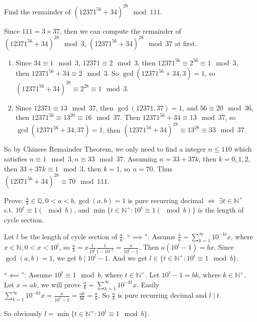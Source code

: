 \documentclass{ctexart}
\begin{document}
\begin{problem}\label{pro:45.2}
  Find the remainder of \((12371^{56} + 34)^{28} \mod 111 \).
\end{problem}
\begin{solution}
  Since \(111 = 3 \times 37\), then we can compute the remainder of \((12371^{56} + 34)^{28} \mod 3\), \((12371^{56} + 34)^{28} \mod 37\) at first.
  \begin{enumerate}
    \item Since \(34 \equiv 1\mod 3\), \(12371 \equiv 2 \mod 3\), then \(12371^{56} \equiv 2^{56}\equiv 1 \mod 3\), then
      \(12371^{56} + 34 \equiv 2 \mod 3\). So \(\gcd(12371^{56}+ 34,3)=1\), so \((12371^{56} + 34)^{28} \equiv 2^{28} \equiv 1 \mod 3\).
    \item Since \(12371 \equiv 13 \mod 37\), then \(\gcd(12371,37)=1\), and \(56 \equiv 20 \mod 36\), then
      \(12371^{56} \equiv 13^{20} \equiv 16 \mod 37\). Then \(12371^{56} + 34 \equiv 13 \mod 37\), so
      \(\gcd(12371^{56} + 34,37)=1\), then \((12371^{56} + 34)^{28} \equiv 13^{28} \equiv 33 \mod 37\).
  \end{enumerate}
  So by Chinese Remainder Theorem, we only need to find a integer \(n \leq 110\) which satisfies \(n \equiv 1 \mod 3, n \equiv 33 \mod 37\).
  Assuming \(n=33 + 37k\), then \(k =0,1,2\), then \(33 + 37k \equiv 1 \mod 3\), then \(k=1\), so \(n=70\).
  Thus \((12371^{56}+34)^{28} \equiv 70 \mod 111\).

\end{solution}

\begin{problem}\label{pro:45.4}
  Prove: \(\frac{a}{b} \in \mathbb{Q}, 0 < a<b , \gcd(a,b)=1\) is pure recurring decimal \(\iff\)
  \(\exists t \in \mathbb{N}^+\) s.t. \(10^t \equiv 1(\mod b)\), and \(\min\{t \in \mathbb{N}^+: 10^t \equiv 1(\mod b)\}\) is the length of cycle section.
\end{problem}
\begin{solution}

  Let \(l\) be the length of cycle section of \(\frac{a}{b}\).
  ``\(\implies\)'': Assume \(\frac{a}{b}=\sum_{k=1}^{\infty} 10^{-kl} x\), where \(x \in \mathbb{N},0 < x <10^l\),
  so \(\frac{a}{b}=x\frac{1}{10^l} \frac{1}{1-10^{-l}}=\frac{x}{10^l-1}\).
  Then \(a(10^l-1)=bx\). Since \(\gcd(a,b)=1\), we get \(b \mid 10^l-1\).
  And we get \(l \in \{t \in \mathbb{N}^+:10^t \equiv 1 \mod b\}\).

  ``\(\impliedby\)'': Assume \(10^t \equiv 1 \mod b\), where \(t \in \mathbb{N}^+\).
  Let \(10^t-1=bk\), where \(k \in \mathbb{N}^+\). Let \(x=ak\), we will prove \(\frac{a}{b}=\sum_{k=1}^{\infty} 10^{-kt} x\).
  Easily \(\sum_{k=1}^{\infty} 10^{-kt}x = \frac{x}{10^t-1}=\frac{ak}{bk}=\frac{a}{b}\).
  So \(\frac{a}{b}\) is pure recurring decimal and \(l \mid t\).

  So obviously \(l=\min\{t \in \mathbb{N}^+:10^t \equiv 1 \mod b\}\).
\end{solution}
\end{document}
